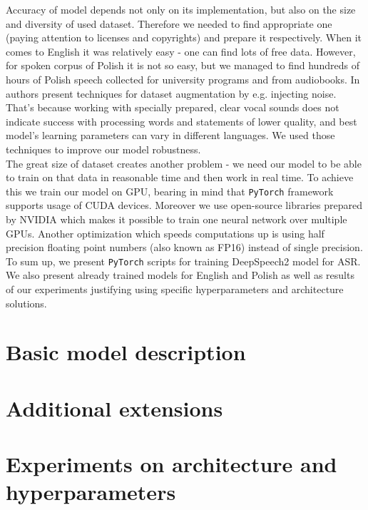 \documentclass[11pt,a4paper]{article}
\begin{document}
Accuracy of model depends not only on its implementation, but also on the size and diversity of used dataset. Therefore we needed to find appropriate one (paying attention to licenses and copyrights) and prepare it respectively. When it comes to English it was relatively easy - one can find lots of free data. However, for spoken corpus of Polish it is not so easy, but we managed to find hundreds of hours of Polish speech collected for university programs and from audiobooks. In \cite{DS1} authors present techniques for dataset augmentation by e.g. injecting noise. That's because working with specially prepared, clear vocal sounds does not indicate success with processing words and statements of lower quality, and best model's learning parameters can vary in different languages. We used those techniques to improve our model robustness.\\

The great size of dataset creates another problem - we need our model to be able to train on that data in reasonable time and then work in real time. To achieve this we train our model on GPU, bearing in mind that \texttt{PyTorch} framework supports usage of CUDA devices. Moreover we use open-source libraries prepared by NVIDIA which makes it possible to train one neural network over multiple GPUs. Another optimization which speeds computations up is using half precision floating point numbers (also known as FP16) instead of single precision. \\

To sum up, we present \texttt{PyTorch} scripts for training DeepSpeech2 model for ASR. We also present already trained models for English and Polish as well as results of our experiments justifying using specific hyperparameters and architecture solutions.\\

\newpage
\section{Basic model description}

\newpage
\section{Additional extensions}

\newpage
\section{Experiments on architecture and hyperparameters}
\end{document}
